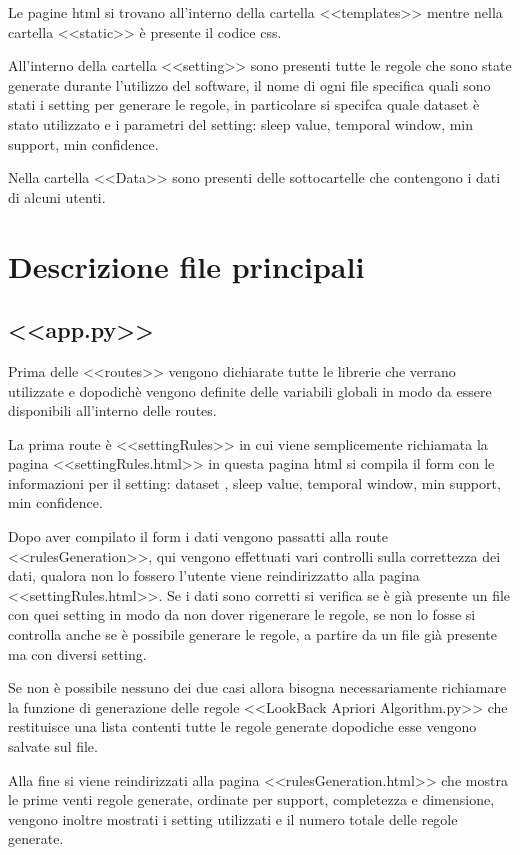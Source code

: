 \documentclass{article}
\begin{document}
Le pagine html si trovano all'interno della cartella <<templates>> mentre nella cartella <<static>> è presente il codice css.

All'interno della cartella <<setting>> sono presenti tutte le regole che sono state generate durante l'utilizzo del software, il nome di ogni file specifica quali sono stati i setting per generare le regole, in particolare si specifca quale dataset è stato utilizzato e i parametri del setting:  sleep value, temporal window, min support, min confidence.

Nella cartella <<Data>> sono presenti delle sottocartelle che contengono i dati di alcuni utenti.

\section{Descrizione file principali}
\subsection{<<app.py>>}
Prima delle <<routes>> vengono dichiarate tutte le librerie che verrano utilizzate e dopodichè vengono definite delle variabili globali in modo da essere disponibili all'interno delle routes.

La prima route è <<settingRules>> in cui viene semplicemente richiamata la pagina <<settingRules.html>> in questa pagina html si compila il form con le informazioni per il setting: dataset , sleep value, temporal window, min support, min confidence. 

Dopo aver compilato il form i dati vengono passatti alla route <<rulesGeneration>>, qui vengono effettuati vari controlli sulla correttezza dei dati, qualora non lo fossero l'utente viene reindirizzatto alla pagina <<settingRules.html>>. Se i dati sono corretti si verifica se è già presente un file con quei  setting in modo da non dover rigenerare le regole, se non lo fosse si controlla anche se è possibile generare le regole, a partire da un file già presente ma con diversi setting.

 Se non è possibile nessuno dei due casi allora bisogna necessariamente  richiamare la funzione di generazione delle regole <<LookBack Apriori Algorithm.py>> che restituisce una lista contenti tutte le regole generate dopodiche esse vengono salvate sul file.

Alla fine si viene reindirizzati alla pagina <<rulesGeneration.html>> che mostra le prime venti regole generate, ordinate per support, completezza e dimensione, vengono inoltre mostrati i setting utilizzati e il numero totale delle regole generate.
\end{document}
